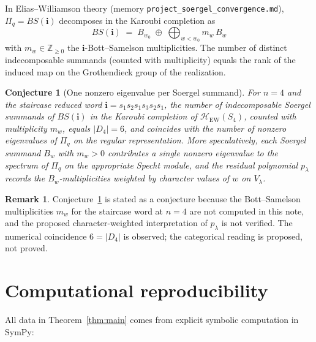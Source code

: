 \documentclass[11pt]{article}
\newtheorem{conjecture}[theorem]{Conjecture}
\theoremstyle{definition}
\newtheorem{remark}[theorem]{Remark}
\begin{document}
In Elias--Williamson theory (memory
\texttt{project\_soergel\_convergence.md}), $\Pi_q = BS(\mathbf{i})$
decomposes in the Karoubi completion as
\[
BS(\mathbf{i}) \;=\; B_{w_0} \;\oplus\; \bigoplus_{w < w_0} m_w\, B_w
\]
with $m_w \in \mathbb{Z}_{\geq 0}$ the $\mathbf{i}$-Bott--Samelson
multiplicities. The number of distinct indecomposable summands (counted
with multiplicity) equals the rank of the induced map on the
Grothendieck group of the realization.

\begin{conjecture}[One nonzero eigenvalue per Soergel summand]\label{conj:soergel-eig}
For $n=4$ and the staircase reduced word $\mathbf{i} = s_1 s_2 s_1 s_3 s_2 s_1$,
the number of indecomposable Soergel summands of $BS(\mathbf{i})$ in the
Karoubi completion of $\mathcal{H}_{\mathrm{EW}}(S_4)$, counted with
multiplicity $m_w$, equals $|D_4| = 6$, and coincides with the number of
nonzero eigenvalues of $\Pi_q$ on the regular representation. More
speculatively, each Soergel summand $B_w$ with $m_w > 0$ contributes a
single nonzero eigenvalue to the spectrum of $\Pi_q$ on the appropriate
Specht module, and the residual polynomial $p_\lambda$ records the
$B_w$-multiplicities weighted by character values of $w$ on $V_\lambda$.
\end{conjecture}

\begin{remark}
Conjecture~\ref{conj:soergel-eig} is stated as a conjecture because the
Bott--Samelson multiplicities $m_w$ for the staircase word at $n=4$ are not
computed in this note, and the proposed character-weighted interpretation
of $p_\lambda$ is not verified. The numerical coincidence
$6 = |D_4|$ is observed; the categorical reading is proposed, not proved.
\end{remark}

\section{Computational reproducibility}

All data in Theorem~\ref{thm:main} comes from explicit symbolic computation
in SymPy:
\end{document}
